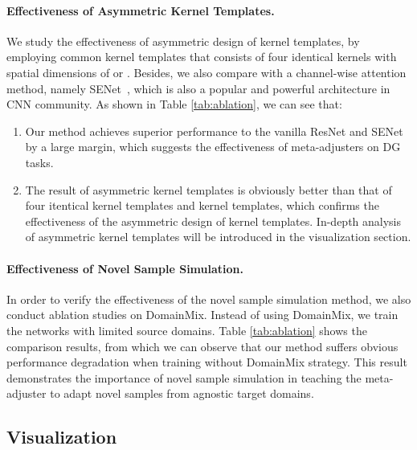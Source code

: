 \documentclass{article}
\begin{document}
\paragraph{Effectiveness of Asymmetric Kernel Templates.}
We study the effectiveness of asymmetric design of kernel templates, by employing common kernel templates that consists of four identical kernels with spatial dimensions of  or . Besides, we also compare with a channel-wise attention method, namely SENet~\cite{senet}, which is also a popular and powerful architecture in CNN community.
As shown in Table \ref{tab:ablation}, we can see that: 
\begin{enumerate}[1)]
    \item Our method achieves superior performance to the vanilla ResNet and SENet by a large margin, which suggests the effectiveness of meta-adjusters on DG tasks.
    \item The result of asymmetric kernel templates is obviously better than that of four itentical  kernel templates and  kernel templates, which confirms the effectiveness of the asymmetric design of kernel templates. In-depth analysis of asymmetric kernel templates will be introduced in the visualization section.
\end{enumerate}


\paragraph{Effectiveness of Novel Sample Simulation.} 
In order to verify the effectiveness of the novel sample simulation method, we also conduct ablation studies on DomainMix. Instead of using DomainMix, we train the networks with limited source domains. Table \ref{tab:ablation} shows the comparison results, from which we can observe that our method suffers obvious performance degradation when training without DomainMix strategy. This result demonstrates the importance of novel sample simulation in teaching the meta-adjuster to adapt novel samples from agnostic target domains.




\subsection{Visualization}
\end{document}
